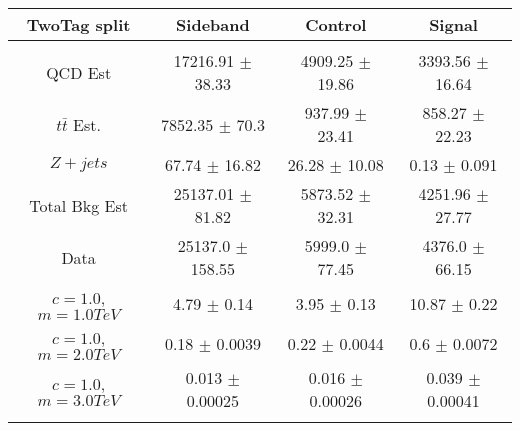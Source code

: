 \begin{footnotesize} 
\begin{tabular}{c|c|c|c} 
TwoTag split & Sideband & Control & Signal \\ 
\hline\hline 
& & & \\ 
QCD Est & 17216.91 $\pm$ 38.33 & 4909.25 $\pm$ 19.86 & 3393.56 $\pm$ 16.64\\ 
$t\bar{t}$ Est.  & 7852.35 $\pm$ 70.3 & 937.99 $\pm$ 23.41 & 858.27 $\pm$ 22.23\\ 
$Z+jets$ & 67.74 $\pm$ 16.82 & 26.28 $\pm$ 10.08 & 0.13 $\pm$ 0.091\\ 
Total Bkg Est & 25137.01 $\pm$ 81.82 & 5873.52 $\pm$ 32.31 & 4251.96 $\pm$ 27.77\\ 
Data & 25137.0 $\pm$ 158.55 & 5999.0 $\pm$ 77.45 & 4376.0 $\pm$ 66.15\\ 
$c=1.0$,$m=1.0TeV$ & 4.79 $\pm$ 0.14 & 3.95 $\pm$ 0.13 & 10.87 $\pm$ 0.22\\ 
$c=1.0$,$m=2.0TeV$ & 0.18 $\pm$ 0.0039 & 0.22 $\pm$ 0.0044 & 0.6 $\pm$ 0.0072\\ 
$c=1.0$,$m=3.0TeV$ & 0.013 $\pm$ 0.00025 & 0.016 $\pm$ 0.00026 & 0.039 $\pm$ 0.00041\\ 
& & & \\ 
\hline\hline 
\end{tabular} 
\end{footnotesize} 
\newline 
